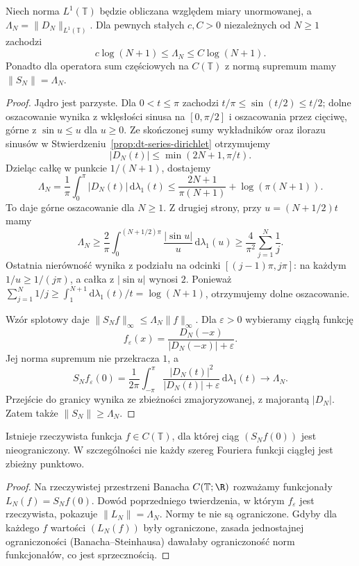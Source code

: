 \begin{twierdzenie}
\label{thm:dt-dirichlet-norm}
Niech norma $L^1(\mathbb T)$ będzie obliczana
względem miary unormowanej, a
$\Lambda_N=\|D_N\|_{L^1(\mathbb T)}$.
Dla pewnych stałych $c,C>0$ niezależnych od $N\ge1$
zachodzi
\[
 c\log(N+1)\le\Lambda_N\le C\log(N+1).
\]
Ponadto dla operatora sum częściowych na $C(\mathbb T)$
z normą supremum mamy $\|S_N\|=\Lambda_N$.
\end{twierdzenie}
\begin{proof}
Jądro jest parzyste. Dla $0<t\le\pi$ zachodzi
$t/\pi\le\sin(t/2)\le t/2$; dolne oszacowanie
wynika z wklęsłości sinusa na $[0,\pi/2]$
i oszacowania przez cięciwę, górne z
$\sin u\le u$ dla $u\ge0$.
Ze skończonej sumy wykładników oraz ilorazu
sinusów w Stwierdzeniu~\ref{prop:dt-series-dirichlet}
otrzymujemy
\[
 |D_N(t)|\le\min(2N+1,\pi/t).
\]
Dzieląc całkę w punkcie $1/(N+1)$, dostajemy
\[
 \Lambda_N=\frac1\pi\int_0^\pi |D_N(t)|\,\mathrm d\lambda_1(t)
 \le\frac{2N+1}{\pi(N+1)}+\log(\pi(N+1)).
\]
To daje górne oszacowanie dla $N\ge1$.
Z drugiej strony, przy $u=(N+1/2)t$ mamy
\[
 \Lambda_N\ge\frac2\pi
 \int_0^{(N+1/2)\pi}\frac{|\sin u|}{u}\,\mathrm d\lambda_1(u)
 \ge\frac4{\pi^2}\sum_{j=1}^N\frac1j.
\]
Ostatnia nierówność wynika z podziału na odcinki
$[(j-1)\pi,j\pi]$: na każdym $1/u\ge1/(j\pi)$,
a całka z $|\sin u|$ wynosi $2$.
Ponieważ $\sum_{j=1}^N1/j\ge\int_1^{N+1}
\mathrm d\lambda_1(t)/t=\log(N+1)$, otrzymujemy
dolne oszacowanie.

Wzór splotowy daje
$\|S_Nf\|_\infty\le\Lambda_N\|f\|_\infty$.
Dla $\varepsilon>0$ wybieramy ciągłą funkcję
\[
 f_\varepsilon(x)=
 \frac{D_N(-x)}{|D_N(-x)|+\varepsilon}.
\]
Jej norma supremum nie przekracza $1$, a
\[
 S_N f_\varepsilon(0)=\frac1{2\pi}
 \int_{-\pi}^\pi
 \frac{|D_N(t)|^2}{|D_N(t)|+\varepsilon}
 \,\mathrm d\lambda_1(t)\longrightarrow\Lambda_N.
\]
Przejście do granicy wynika ze zbieżności
zmajoryzowanej, z majorantą $|D_N|$.
Zatem także $\|S_N\|\ge\Lambda_N$.
\end{proof}

\begin{wniosek}
\label{cor:dt-dirichlet-unbounded}
Istnieje rzeczywista funkcja $f\in C(\mathbb T)$,
dla której ciąg $(S_Nf(0))$ jest nieograniczony.
W szczególności nie każdy szereg Fouriera
funkcji ciągłej jest zbieżny punktowo.
\end{wniosek}
\begin{proof}
Na rzeczywistej przestrzeni Banacha $C(\mathbb T;\R)$
rozważamy funkcjonały $L_N(f)=S_Nf(0)$.
Dowód poprzedniego twierdzenia, w którym
$f_\varepsilon$ jest rzeczywista, pokazuje
$\|L_N\|=\Lambda_N$. Normy te nie są ograniczone.
Gdyby dla każdego $f$ wartości $(L_N(f))$ były
ograniczone, zasada jednostajnej ograniczoności
(Banacha--Steinhausa) dawałaby ograniczoność
norm funkcjonałów, co jest sprzecznością.
\end{proof}

